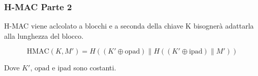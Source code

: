 \begin{frame}
    \frametitle{H-MAC Parte 2}

H-MAC viene aclcolato a blocchi e a seconda della chiave K bisognerà adattarla alla lunghezza del blocco.

\[
\text{HMAC}(K, M') = H((K' \oplus \text{opad}) \| H((K' \oplus \text{ipad}) \| M'))
\]

Dove $K'$, $\text{opad}$ e $\text{ipad}$ sono costanti.

\end{frame}